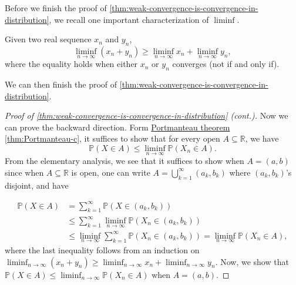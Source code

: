 Before we finish the proof of \autoref{thm:weak-convergence-is-convergence-in-distribution}, we recall one important characterization of \(\liminf\).

\begin{prev}
	Given two real sequence \(x_n\) and \(y_n\),
	\[
		\liminf_{n \to \infty} (x_n + y_n) \geq \liminf_{n \to \infty} x_n + \liminf_{n \to \infty} y_n,
	\]
	where the equality holds when either \(x_n\) or \(y_n\) converges (not if and only if).
\end{prev}

We can then finish the proof of \autoref{thm:weak-convergence-is-convergence-in-distribution}.

\begin{proof}[Proof of \autoref{thm:weak-convergence-is-convergence-in-distribution} (cont.)]\label{pf:thm:weak-convergence-is-convergence-in-distribution}
	Now we can prove the backward direction. Form \hyperref[thm:Portmanteau]{Portmanteau theorem} \autoref{thm:Portmanteau-c}, it suffices to show that for every open \(A \subseteq \mathbb{R} \), we have
	\[
		\mathbb{P} (X \in A) \leq \liminf_{n \to \infty} \mathbb{P} (X_n \in A).
	\]
	From the elementary analysis, we see that it suffices to show when \(A = (a, b)\) since when \(A \subseteq \mathbb{R} \) is open, one can write \(A = \bigcup_{k=1}^{\infty} (a_k, b_k)\) where \((a_k, b_k)\)'s disjoint, and have

	\begin{align*}
		\mathbb{P} (X \in A)
		 & = \sum_{k=1}^{\infty} \mathbb{P} (X \in (a_k, b_k))                                                                        \\
		 & \leq \sum_{k=1}^{\infty} \liminf_{n \to \infty} \mathbb{P} (X_n \in (a_k, b_k)) \tag*{assume true for each \((a_k, b_k)\)} \\
		 & \leq \liminf_{n \to \infty} \sum_{k=1}^{\infty} \mathbb{P} (X_n \in (a_k, b_k))
		= \liminf_{n \to \infty} \mathbb{P} (X_n \in A),
	\end{align*}
	where the last inequality follows from an induction on \(\liminf_{n \to \infty} (x_n + y_n) \geq \liminf_{n \to \infty} x_n + \liminf_{n \to \infty} y_n\). Now, we show that \(\mathbb{P} (X \in A) \leq \liminf_{n \to \infty} \mathbb{P} (X_n \in A)\) when \(A = (a, b)\).


\end{proof}
